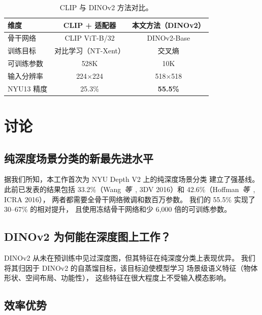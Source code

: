 \documentclass[conference, a4paper]{IEEEtran}
\begin{document}
\begin{table}[htb]
    \centering
    \caption{CLIP 与 DINOv2 方法对比。}
    \label{tab:comparison}
    \footnotesize
    \begin{tabular}{lcc}
        \toprule
        \textbf{维度} & \textbf{CLIP + 适配器} & \textbf{本文方法（DINOv2）} \\
        \midrule
        骨干网络 & CLIP ViT-B/32 & DINOv2-Base \\
        训练目标 & 对比学习（NT-Xent） & 交叉熵 \\
        可训练参数 & 528K & 10K \\
        输入分辨率 & 224$\times$224 & 518$\times$518 \\
        NYU13 精度 & 25.3\% & \textbf{55.5\%} \\
        \bottomrule
    \end{tabular}
\end{table}

\section{讨论}

\subsection{纯深度场景分类的新最先进水平}

据我们所知，本工作首次为 NYU Depth V2 上的纯深度场景分类
建立了强基线。此前已发表的结果包括
33.2\%（Wang~\textit{等}~\cite{wang3d}, 3DV 2016）和
42.6\%（Hoffman~\textit{等}~\cite{hoffman2016}, ICRA 2016），
两者都需要全骨干网络微调和数百万参数。
我们的 55.5\% 实现了 30--67\% 的相对提升，
且使用冻结骨干网络和少 6,000 倍的可训练参数。

\subsection{DINOv2 为何能在深度图上工作？}

DINOv2 从未在预训练中见过深度图，但其特征在纯深度分类上表现优异。
我们将其归因于 DINOv2 的自蒸馏目标，该目标迫使模型学习
场景级语义特征（物体形状、空间布局、功能性），
这些特征在很大程度上不受输入模态影响。

\subsection{效率优势}
\end{document}
